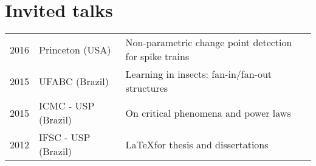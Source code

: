 \documentclass[letter,10pt]{article} %
\begin{document}
\section{Invited talks}

\begin{longtable}{lll}
  2016  & Princeton (USA) & Non-parametric change point detection for spike trains \\
  2015  & UFABC (Brazil) &  Learning in insects: fan-in/fan-out structures  \\
  2015  & ICMC - USP (Brazil) &  On critical phenomena and power laws  \\
  2012  & IFSC - USP (Brazil) &  \LaTeX for thesis and dissertations  \\
\end{longtable}
\end{document}
